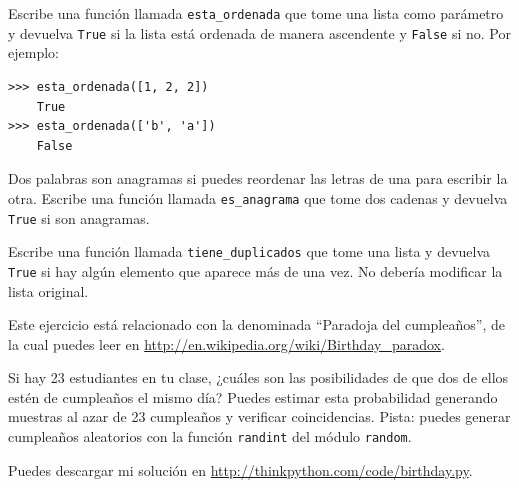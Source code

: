 \documentclass[10pt]{book}
\begin{document}
\begin{exercise}
Escribe una función llamada \verb"esta_ordenada" que tome una lista como
parámetro y devuelva {\tt True} si la lista está ordenada de manera
ascendente y {\tt False} si no.  Por ejemplo:

\begin{verbatim}
>>> esta_ordenada([1, 2, 2])
    True
>>> esta_ordenada(['b', 'a'])
    False
\end{verbatim}

\end{exercise}


\begin{exercise}
\label{anagram}

Dos palabras son anagramas si puedes reordenar las letras de una
para escribir la otra.  Escribe una función llamada \verb"es_anagrama"
que tome dos cadenas y devuelva {\tt True} si son anagramas.
\end{exercise}



\begin{exercise}
\label{duplicate}

Escribe una función llamada \verb"tiene_duplicados" que tome
una lista y devuelva {\tt True} si hay algún elemento que
aparece más de una vez.  No debería modificar la lista
original.

\end{exercise}


\begin{exercise}

Este ejercicio está relacionado con la denominada ``Paradoja del cumpleaños'', de la cual
puedes leer en \url{http://en.wikipedia.org/wiki/Birthday_paradox}.

Si hay 23 estudiantes en tu clase, ¿cuáles son las posibilidades
de que dos de ellos estén de cumpleaños el mismo día?  Puedes estimar esta
probabilidad generando muestras al azar de 23 cumpleaños
y verificar coincidencias.  Pista: puedes generar cumpleaños aleatorios
con la función {\tt randint} del módulo {\tt random}.

Puedes descargar mi
solución en \url{http://thinkpython.com/code/birthday.py}.

\end{exercise}
\end{document}
